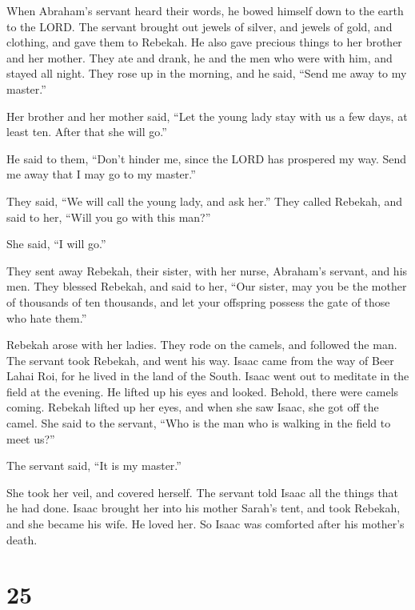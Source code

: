  When Abraham's servant heard their words, he bowed himself
down to the earth to the LORD.  The servant brought out
jewels of silver, and jewels of gold, and clothing, and gave them to
Rebekah. He also gave precious things to her brother and her mother.
 They ate and drank, he and the men who were with him, and
stayed all night. They rose up in the morning, and he said, ``Send me
away to my master.''

 Her brother and her mother said, ``Let the young lady stay
with us a few days, at least ten. After that she will go.''

 He said to them, ``Don't hinder me, since the LORD has
prospered my way. Send me away that I may go to my master.''

 They said, ``We will call the young lady, and ask her.''
 They called Rebekah, and said to her, ``Will you go with
this man?''

She said, ``I will go.''

 They sent away Rebekah, their sister, with her nurse,
Abraham's servant, and his men.  They blessed Rebekah, and
said to her, ``Our sister, may you be the mother of thousands of ten
thousands, and let your offspring possess the gate of those who hate
them.''

 Rebekah arose with her ladies. They rode on the camels,
and followed the man. The servant took Rebekah, and went his way.
 Isaac came from the way of Beer Lahai Roi, for he lived in
the land of the South.  Isaac went out to meditate in the
field at the evening. He lifted up his eyes and looked. Behold, there
were camels coming.  Rebekah lifted up her eyes, and when
she saw Isaac, she got off the camel.  She said to the
servant, ``Who is the man who is walking in the field to meet us?''

The servant said, ``It is my master.''

She took her veil, and covered herself.  The servant told
Isaac all the things that he had done.  Isaac brought her
into his mother Sarah's tent, and took Rebekah, and she became his wife.
He loved her. So Isaac was comforted after his mother's death.

\hypertarget{section-24}{%
\section{25}\label{section-24}}


